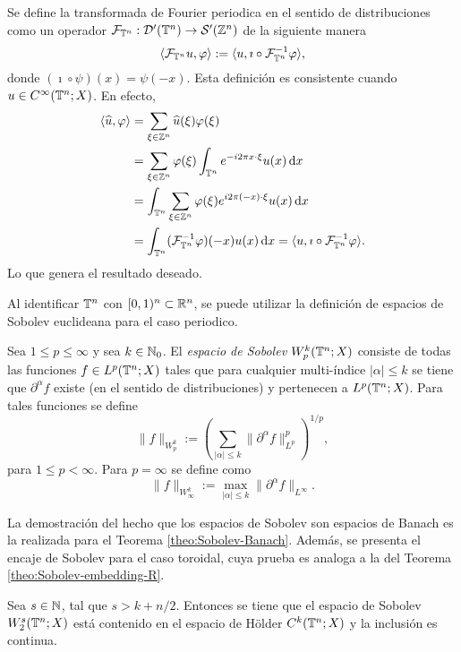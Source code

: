 \begin{definition}
	Se define la transformada de Fourier periodica en el sentido de distribuciones como un operador $\mathcal{F}_{\mathbb{T}^n}:\mathcal{D}'(\mathbb{T}^n)\to\mathcal{S}'(\mathbb{Z}^n)$ de la siguiente manera
	\begin{equation*}
		\langle\mathcal{F}_{\mathbb{T}^n}u, \varphi\rangle := \langle u, \imath \circ \mathcal{F}_{\mathbb{T}^n}^{-1}\varphi\rangle,
	\end{equation*}
	donde $(\imath\circ\psi)(x) = \psi(-x)$. Esta definición es consistente cuando $u\in C^\infty(\mathbb{T}^n;X)$. En efecto, 
	\begin{align*}
		\langle\widehat{u}, \varphi\rangle &= \sum_{\xi\in\mathbb{Z}^n}\widehat{u}(\xi)\varphi(\xi)\\
		& = \sum_{\xi\in\mathbb{Z}^n} \varphi(\xi) \int_{\mathbb{T}^n}e^{-i2\pi x\cdot\xi}  u(x) \mathop{}\!\mathrm{d} x \\
		& =\int_{\mathbb{T}^n}  \sum_{\xi\in\mathbb{Z}^n} \varphi(\xi) e^{i2\pi (-x)\cdot\xi}u(x)\mathop{}\!\mathrm{d} x \\
		& = \int_{\mathbb{T}^n} (\mathcal{F}_{\mathbb{T}^n}^{-1}\varphi)(-x) u(x) \mathop{}\!\mathrm{d} x = \langle u, \imath\circ \mathcal{F}_{\mathbb{T}^n}^{-1}\varphi\rangle.
	\end{align*}
	Lo que genera el resultado deseado.
\end{definition}
Al identificar $\mathbb{T}^n$ con $[0,1)^n\subset\mathbb{R}^n$, se puede utilizar la definición de espacios de Sobolev euclideana para el caso periodico.
\begin{definition}
	Sea $1\leq p \leq\infty$ y sea $k\in\mathbb{N}_0$. El \textit{espacio de Sobolev} $W^k_p(\mathbb{T}^n;X)$ consiste de todas las funciones $f\in L^p(\mathbb{T}^n;X)$ tales que para cualquier multi-índice $|\alpha|\leq k$ se tiene que $\partial^\alpha f$ existe (en el sentido de distribuciones) y pertenecen a $L^p(\mathbb{T}^n;X)$. Para tales funciones se define 
	\begin{equation*}
		\|f\|_{W^k_p} := \left( \sum_{|\alpha|\leq k} \|\partial^\alpha f\|_{L^p}^p
		\right)^{1/p},
	\end{equation*}
	para $1\leq p <\infty$. Para $p=\infty$ se define como 
	\begin{equation*}
		\|f\|_{W^k_\infty} := \max_{|\alpha|\leq k} \|\partial^\alpha f\|_{L^\infty}.
	\end{equation*}
\end{definition}
La demostración del hecho que los espacios de Sobolev son espacios de Banach es la realizada para el Teorema \ref{theo:Sobolev-Banach}. Además, se presenta el encaje de Sobolev para el caso toroidal, cuya prueba es analoga a la del Teorema \ref{theo:Sobolev-embedding-R}.
\begin{theorem}\label{theo:Sobolev-embedding-T}
	Sea $s\in\mathbb{N}$, tal que $s>k+n/2$. Entonces se tiene que el espacio de Sobolev $W^s_2(\mathbb{T}^n;X)$ está contenido en el espacio de H\"older $C^k(\mathbb{T}^n;X)$ y la inclusión es continua.
\end{theorem}
